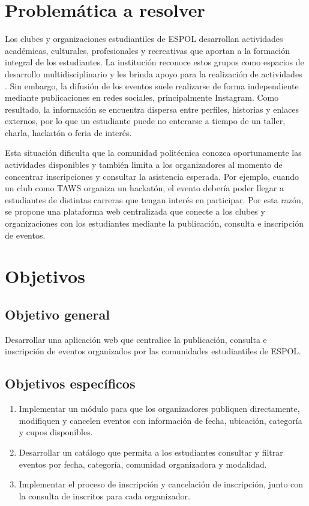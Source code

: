 \documentclass[12pt]{article}
\begin{document}
\tableofcontents
\newpage
\listoftables
\newpage
\listoffigures
\newpage

\section{Problemática a resolver}

Los clubes y organizaciones estudiantiles de ESPOL desarrollan actividades académicas, culturales, profesionales y recreativas que aportan a la formación integral de los estudiantes. La institución reconoce estos grupos como espacios de desarrollo multidisciplinario y les brinda apoyo para la realización de actividades \cite{espolclubes,programaclubes}. Sin embargo, la difusión de los eventos suele realizarse de forma independiente mediante publicaciones en redes sociales, principalmente Instagram. Como resultado, la información se encuentra dispersa entre perfiles, historias y enlaces externos, por lo que un estudiante puede no enterarse a tiempo de un taller, charla, hackatón o feria de interés.

Esta situación dificulta que la comunidad politécnica conozca oportunamente las actividades disponibles y también limita a los organizadores al momento de concentrar inscripciones y consultar la asistencia esperada. Por ejemplo, cuando un club como TAWS organiza un hackatón, el evento debería poder llegar a estudiantes de distintas carreras que tengan interés en participar. Por esta razón, se propone una plataforma web centralizada que conecte a los clubes y organizaciones con los estudiantes mediante la publicación, consulta e inscripción de eventos.

\section{Objetivos}

\subsection{Objetivo general}

Desarrollar una aplicación web que centralice la publicación, consulta e inscripción de eventos organizados por las comunidades estudiantiles de ESPOL.

\subsection{Objetivos específicos}

\begin{enumerate}
    \item Implementar un módulo para que los organizadores publiquen directamente, modifiquen y cancelen eventos con información de fecha, ubicación, categoría y cupos disponibles.
    \item Desarrollar un catálogo que permita a los estudiantes consultar y filtrar eventos por fecha, categoría, comunidad organizadora y modalidad.
    \item Implementar el proceso de inscripción y cancelación de inscripción, junto con la consulta de inscritos para cada organizador.
\end{enumerate}
\end{document}
